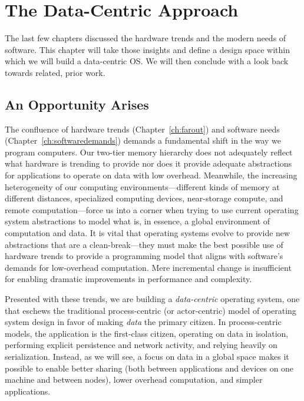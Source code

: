 
\chapter{The Data-Centric Approach}\label{ch:datacentric}


\begin{chabstract}
    The last few chapters discussed the hardware trends and the modern needs of software. This chapter will take those
    insights and define a design space within which we will build a data-centric OS. We will then conclude with a look
    back towards related, prior work.
\end{chabstract}

\section{An Opportunity Arises}

The confluence of hardware trends (Chapter~\ref{ch:farout}) and software needs (Chapter~\ref{ch:softwaredemands})
demands a fundamental shift in the way we program computers. Our two-tier memory hierarchy does not adequately reflect
what hardware is trending to provide nor does it provide adequate abstractions for applications to operate on data with
low overhead. Meanwhile, the increasing heterogeneity of our computing environments---different kinds of memory
at different distances, specialized computing devices, near-storage compute, and remote computation---force us into a
corner when trying to use current operating system abstractions to model what is, in essence, a global environment of computation and
data. It is vital that operating systems evolve to provide new abstractions that are a clean-break---they must make the
best possible use of hardware trends to provide a programming model that aligns with software's demands for low-overhead
computation. Mere incremental change is insufficient for enabling dramatic improvements in performance and complexity.

Presented with these trends, we are building a \emph{data-centric} operating system, one that eschews the traditional
process-centric (or actor-centric) model of operating system design in favor of making \emph{data} the primary citizen.
In process-centric models, the application is the first-class citizen, operating on data in isolation, performing
explicit persistence and network activity, and relying heavily on serialization. Instead, as we will see, a focus on data in a global
space makes it possible to enable better sharing (both between applications and devices on one machine and between
nodes), lower overhead computation, and simpler applications.

